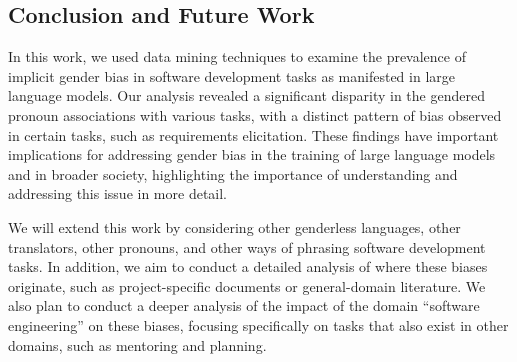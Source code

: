 \documentclass[10pt,conference]{IEEEtran}
\begin{document}
\begin{sloppy}
\section{Conclusion and Future Work}

In this work, we used data mining techniques to examine the prevalence of implicit gender bias in software development tasks as manifested in large language models. Our analysis revealed a significant disparity in the gendered pronoun associations with various tasks, with a distinct pattern of bias observed in certain tasks, such as requirements elicitation. These findings have important implications for addressing gender bias in the training of large language models and in broader society, highlighting the importance of understanding and addressing this issue in more detail.

We will extend this work by considering other genderless languages, other translators, other pronouns, and other ways of phrasing software development tasks. In addition, we aim to conduct a detailed analysis of where these biases originate, such as project-specific documents or general-domain literature. We also plan to conduct a deeper analysis of the impact of the domain ``software engineering'' on these biases, focusing specifically on tasks that also exist in other domains, such as mentoring and planning.




\end{sloppy}
\end{document}
